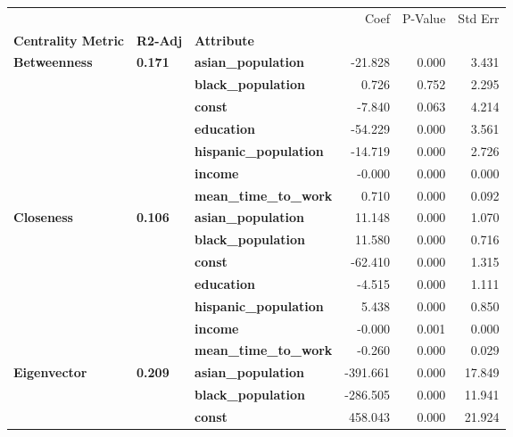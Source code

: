 \begin{tabular}{lllrrr}
\toprule
             &       &                   &     Coef &  P-Value &  Std Err \\
\textbf{Centrality Metric} & \textbf{R2-Adj} & \textbf{Attribute} &          &          &          \\
\midrule
\multirow{7}{*}{\textbf{Betweenness}} & \multirow{7}{*}{\textbf{0.171}} & \textbf{asian\_population} &  -21.828 &    0.000 &    3.431 \\
             &       & \textbf{black\_population} &    0.726 &    0.752 &    2.295 \\
             &       & \textbf{const} &   -7.840 &    0.063 &    4.214 \\
             &       & \textbf{education} &  -54.229 &    0.000 &    3.561 \\
             &       & \textbf{hispanic\_population} &  -14.719 &    0.000 &    2.726 \\
             &       & \textbf{income} &   -0.000 &    0.000 &    0.000 \\
             &       & \textbf{mean\_time\_to\_work} &    0.710 &    0.000 &    0.092 \\
\cline{1-6}
\cline{2-6}
\multirow{7}{*}{\textbf{Closeness}} & \multirow{7}{*}{\textbf{0.106}} & \textbf{asian\_population} &   11.148 &    0.000 &    1.070 \\
             &       & \textbf{black\_population} &   11.580 &    0.000 &    0.716 \\
             &       & \textbf{const} &  -62.410 &    0.000 &    1.315 \\
             &       & \textbf{education} &   -4.515 &    0.000 &    1.111 \\
             &       & \textbf{hispanic\_population} &    5.438 &    0.000 &    0.850 \\
             &       & \textbf{income} &   -0.000 &    0.001 &    0.000 \\
             &       & \textbf{mean\_time\_to\_work} &   -0.260 &    0.000 &    0.029 \\
\cline{1-6}
\cline{2-6}
\multirow{7}{*}{\textbf{Eigenvector}} & \multirow{7}{*}{\textbf{0.209}} & \textbf{asian\_population} & -391.661 &    0.000 &   17.849 \\
             &       & \textbf{black\_population} & -286.505 &    0.000 &   11.941 \\
             &       & \textbf{const} &  458.043 &    0.000 &   21.924 \\

\end{tabular}
